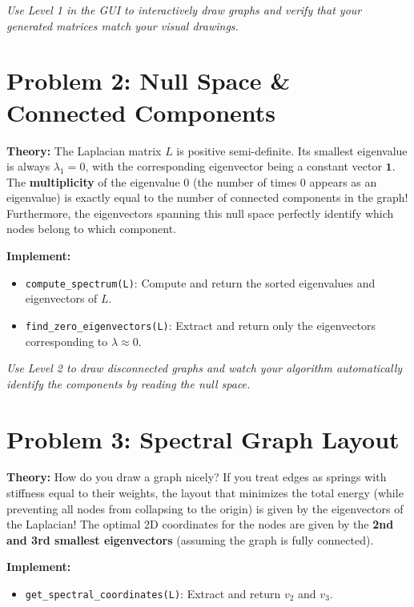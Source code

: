 \documentclass[11pt]{article}
\begin{document}
\textit{Use Level 1 in the GUI to interactively draw graphs and verify that your generated matrices match your visual drawings.}

\section*{Problem 2: Null Space \& Connected Components}

\textbf{Theory:} The Laplacian matrix $L$ is positive semi-definite. Its smallest eigenvalue is always $\lambda_1 = 0$, with the corresponding eigenvector being a constant vector $\mathbf{1}$. 
The \textbf{multiplicity} of the eigenvalue $0$ (the number of times $0$ appears as an eigenvalue) is exactly equal to the number of connected components in the graph! Furthermore, the eigenvectors spanning this null space perfectly identify which nodes belong to which component.

\textbf{Implement:}
\begin{itemize}
    \item \lstinline|compute_spectrum(L)|: Compute and return the sorted eigenvalues and eigenvectors of $L$.
    \item \lstinline|find_zero_eigenvectors(L)|: Extract and return only the eigenvectors corresponding to $\lambda \approx 0$.
\end{itemize}

\textit{Use Level 2 to draw disconnected graphs and watch your algorithm automatically identify the components by reading the null space.}

\section*{Problem 3: Spectral Graph Layout}

\textbf{Theory:} How do you draw a graph nicely? If you treat edges as springs with stiffness equal to their weights, the layout that minimizes the total energy (while preventing all nodes from collapsing to the origin) is given by the eigenvectors of the Laplacian!
The optimal 2D coordinates for the nodes are given by the \textbf{2nd and 3rd smallest eigenvectors} (assuming the graph is fully connected).

\textbf{Implement:}
\begin{itemize}
    \item \lstinline|get_spectral_coordinates(L)|: Extract and return $v_2$ and $v_3$.
\end{itemize}
\end{document}
